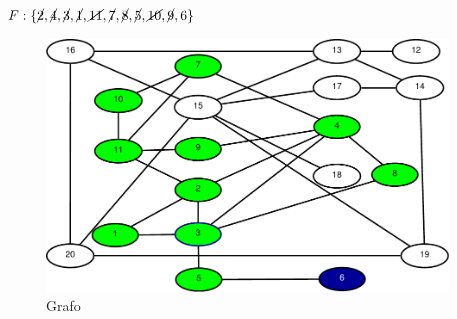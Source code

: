 \begin{frame}
\begin{columns}
\begin{column}{0.5\textwidth}
{	$F:\{\cancel{2},\cancel{4},\cancel{3},\cancel{1},\cancel{11},\cancel{7},\cancel{8},\cancel{5},\cancel{10},\cancel{9},6\}$
				\begin{figure}
					\centering
					\includegraphics[width=\linewidth]{images/buscaEmLargura10}
					\caption{Grafo}
					\label{fig:buscaemlargura11}
				\end{figure}
			}
		\end{column}
		\begin{column}{0.5\textwidth}

		\end{column}
	\end{columns}
\end{frame}

